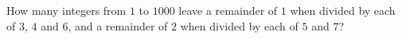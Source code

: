 How many integers from $1$ to $1000$ leave a remainder of $1$ when divided by each of $3$, $4$ and $6$, and a remainder of $2$ when divided by each of $5$ and $7$?
